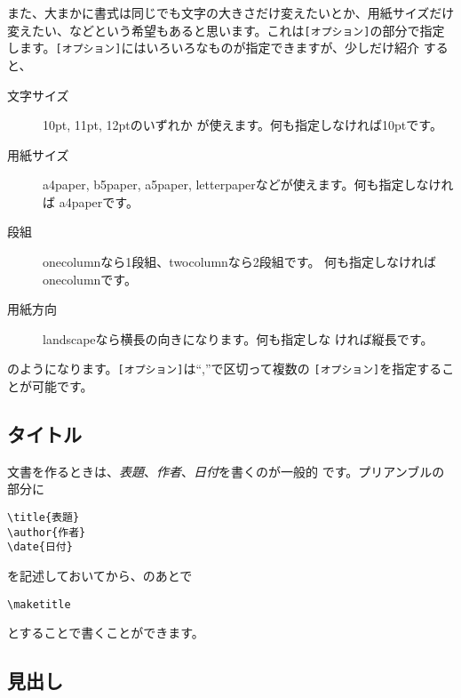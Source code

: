 また、大まかに書式は同じでも文字の大きさだけ変えたいとか、用紙サイズだけ
変えたい、などという希望もあると思います。これは\verb+[オプション]+の部分で指定
します。\verb+[オプション]+にはいろいろなものが指定できますが、少しだけ紹介
すると、
\begin{description}
 \item[文字サイズ] 10pt, 11pt, 12ptのいずれか
	    が使えます。何も指定しなければ10ptです。
 \item[用紙サイズ]  a4paper, b5paper, a5paper,
	    letterpaperなどが使えます。何も指定しなければ
	    a4paperです。
\item[段組] onecolumnなら1段組、twocolumnなら2段組です。
	    何も指定しなければonecolumnです。
\item[用紙方向] landscapeなら横長の向きになります。何も指定しな
	    ければ縦長です。
\end{description}
のようになります。\verb+[オプション]+は``,''で区切って複数の
\verb+[オプション]+を指定することが可能です。

\subsection{タイトル}
文書を作るときは、\emph{表題}、\emph{作者}、\emph{日付}を書くのが一般的
です。プリアンブルの部分に
\begin{screen}
\begin{verbatim}
\title{表題}
\author{作者}
\date{日付}
\end{verbatim}
\end{screen}
を記述しておいてから、\verb++のあとで
\begin{screen}
\begin{verbatim}
\maketitle
\end{verbatim}
\end{screen}
とすることで書くことができます。

\subsection{見出し}

